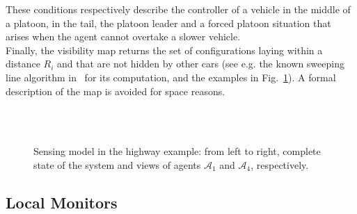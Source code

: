 {\color{red}These conditions respectively describe the controller of a vehicle in the middle of a platoon, in the tail, the platoon leader and a forced platoon situation that arises when the agent cannot overtake a slower vehicle.}\\

Finally, the visibility map returns the set of configurations laying within a distance $R_i$ and that are not hidden by other cars (see e.g. the known sweeping line algorithm in~\cite{thrun2002pr} for its computation, and the examples in Fig.~\ref{fig:ids:model:visi}). A formal description of the map is avoided for space reasons.
\begin{figure}[!]
\centering
{}
\\
\vspace{5pt}
\vspace{5pt}
\\
\caption{Sensing model in the highway example: from left to right, complete state of the system and views of agents $\mathcal{A}_1$ and $\mathcal{A}_4$, respectively.}
\label{fig:ids:model:visi}
\end{figure}


\subsection{Local Monitors}


